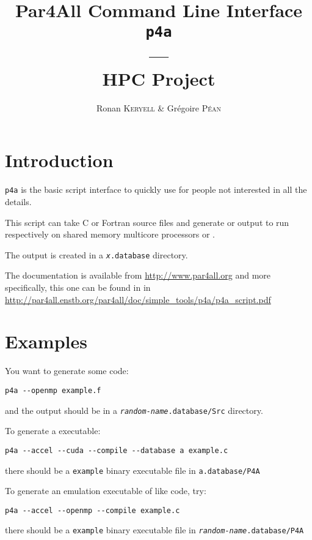 \documentclass[a4paper]{article}
\begin{document}
\title{Par4All Command Line Interface\\
  \texttt{p4a}\\
  ---\\
  HPC Project}

\author{Ronan \textsc{Keryell} \& Grégoire \textsc{Péan}}

\maketitle

\tableofcontents{}

\section{Introduction}
\label{sec:introduction}

\texttt{p4a} is the basic script interface to quickly use \Apfa for people
not interested in all the \Apfa details.

This script can take C or Fortran source files and generate \Aopenmp or
\Acuda output to run respectively on shared memory multicore processors or
\Agpu.

The output is created in a \texttt{\emph{x}.database} directory.

The \Apfa documentation is available from \url{http://www.par4all.org} and
more specifically, this one can be found in \Apdf in
\url{http://par4all.enstb.org/par4all/doc/simple_tools/p4a/p4a_script.pdf}

\section{Examples}
\label{sec:examples}

You want to generate some \Aopenmp code:
\begin{verbatim}
p4a --openmp example.f
\end{verbatim}
and the output should be in a \texttt{\emph{random-name}.database/Src}
directory.

To generate a \Acuda executable:
\begin{verbatim}
p4a --accel --cuda --compile --database a example.c
\end{verbatim}
there should be a \texttt{example} binary executable file in
\texttt{a.database/P4A}

To generate an \Aopenmp emulation executable of \Agpu like code, try:
\begin{verbatim}
p4a --accel --openmp --compile example.c
\end{verbatim}
there should be a \texttt{example} binary executable file in
\texttt{\emph{random-name}.database/P4A}
\end{document}
